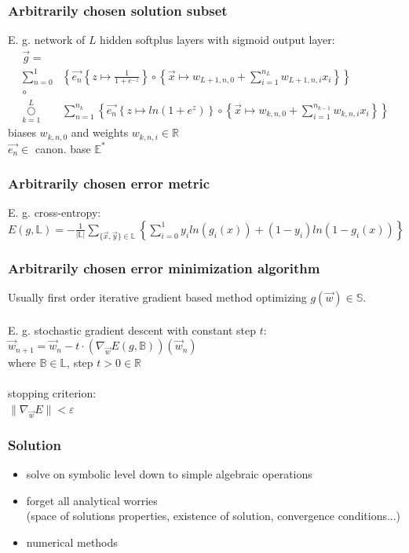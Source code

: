 \documentclass{beamer}
\begin{document}
			\begin{frame}
				\frametitle{Arbitrarily chosen solution subset}
					E. g. network of $L$ hidden softplus layers with sigmoid output layer:
					\begin{align*}
					\vec{g} = &\\
					\sum\limits_{n=0}^1 & \left\{ \vec{e_n} \left\{z \mapsto \frac{1}{1+e^{-z}}\right\} \circ \left\{ \vec{x} \mapsto w_{L+1, n, 0} + \sum\limits_{i=1}^{n_L} w_{L+1, n, i} x_i \right\} \right\} \\
					\circ~& \\
					\underset{k=1}{\overset{L}{\bigcirc}} & \sum\limits_{n=1}^{n_k} \left\{ \vec{e_n} \left\{z \mapsto ln(1+e^z) \right\} \circ \left\{ \vec{x} \mapsto w_{k, n, 0} + \sum\limits_{i=1}^{n_{k-1}} w_{k, n, i} x_i\right\} \right\}
					\end{align*}
					biases $w_{k, n, 0}$ and weights $w_{k, n, i} \in \mathbb{R}$ \\
					$\vec{e_n} \in$ canon. base $\mathbb{E}^{*}$
			\end{frame}
			\begin{frame}
				\frametitle{Arbitrarily chosen error metric}
					E. g. cross-entropy: \\
					$E(g, \mathbb{L}) = -\frac{1}{|\mathbb{L}|}\sum\limits_{\{\vec{x}, \vec{y}\} \in \mathbb{L}} \left\{ \sum\limits_{i=0}^1 y_i ln(g_i(x)) + (1 - y_i)ln(1 - g_i(x)) \right\}$
			\end{frame}
			
			\begin{frame}
				\frametitle{Arbitrarily chosen error minimization algorithm}
				Usually first order iterative gradient based method optimizing $g(\vec{w}) \in \mathbb{S}$. \\~\\
				
				E. g. stochastic gradient descent with constant step $t$:\\
				$\vec{w}_{n+1} = \vec{w}_n - t \cdot (\nabla_{\vec{w}} E(g, \mathbb{B}))(\vec{w}_n)$ \\
				where $\mathbb{B} \in \mathbb{L}$, step $t > 0 \in \mathbb{R}$ \\~\\
                
                stopping criterion:\\
                $\lVert \nabla_{\vec{w}} E \rVert < \varepsilon$
			\end{frame}

			\begin{frame}
				\frametitle{Solution}
				\begin{itemize}
					\item solve on symbolic level down to simple algebraic operations
                    \item forget all analytical worries\\
						(space of solutions properties, existence of solution, convergence conditions...)
					\item numerical methods
				\end{itemize}
			\end{frame}
			
\end{document}
